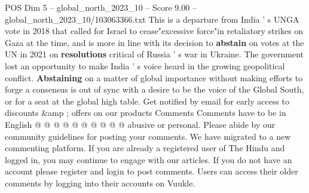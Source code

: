 \begin{textsample}{POS Dim 5 – global\_north\_2023\_10 – Score 9.00 – global\_north\_2023\_10/103063366.txt}
This is a departure from India ' s UNGA vote in 2018 that called for Israel to cease"excessive force"in retaliatory strikes on Gaza at the time, and is more in line with its decision to \textbf{abstain} on votes at the UN in 2021 on \textbf{resolutions} critical of Russia ' s war in Ukraine.
The government lost an opportunity to make India ' s voice heard in the growing geopolitical conflict. \textbf{Abstaining} on a matter of global importance without making efforts to forge a consensus is out of sync with a desire to be the voice of the Global South, or for a seat at the global high table.
Get notified by email for early access to discounts \&amp ; offers on our products Comments Comments have to be in English @ @ @ @ @ @ @ @ @ @ abusive or personal.
Please abide by our community guidelines for posting your comments.
We have migrated to a new commenting platform.
If you are already a registered user of The Hindu and logged in, you may continue to engage with our articles.
If you do not have an account please register and login to post comments.
Users can access their older comments by logging into their accounts on Vuukle.

\end{textsample}
